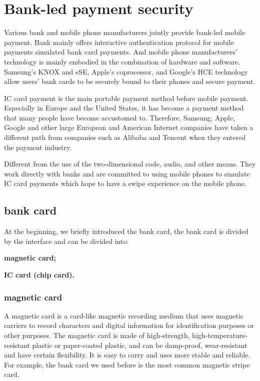 \documentclass[journal]{IEEEtran}
\begin{document}
\section{Bank-led payment security}
Various bank and mobile phone manufacturers jointly provide bank-led mobile payment. Bank mainly offers interactive authentication protocol for mobile payments simulated bank card payments.  And mobile phone manufacturers’ technology is mainly embodied in the combination of hardware and software. Samsung’s KNOX and eSE, Apple’s coprocessor, and Google’s HCE technology allow users’ bank cards to be securely bound to their phones and secure payment. 

IC card payment is the main portable payment method before mobile payment. Especially in Europe and the United States, it has become a payment method that many people have become accustomed to. Therefore, Samsung, Apple, Google and other large European and American Internet companies have taken a different path from companies such as Alibaba and Tencent when they entered the payment industry.

Different from the use of the two-dimensional code, audio, and other means. They work directly with banks and  are committed to using mobile phones to simulate IC card payments which hope to have a swipe experience on the mobile phone.


\subsection{bank card}

At the beginning, we briefly introduced the bank card, the bank card is divided by the interface and can be divided into:

\textbf{magnetic card;}

\textbf{IC card (chip card).}
\subsubsection{magnetic card}
A magnetic card is a card-like magnetic recording medium that uses magnetic carriers to record characters and digital information for identification purposes or other purposes. The magnetic card is made of high-strength, high-temperature-resistant plastic or paper-coated plastic, and can be damp-proof, wear-resistant and have certain flexibility. It is easy to carry and uses more stable and reliable. For example, the bank card we used before is the most common magnetic stripe card.
\end{document}
